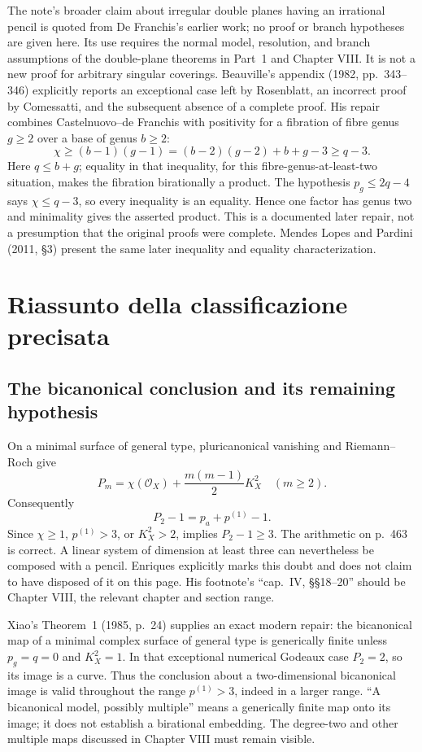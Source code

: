 The note's broader claim about irregular double planes having an irrational pencil is quoted from De Franchis's earlier work; no proof or branch hypotheses are given here. Its use requires the normal model, resolution, and branch assumptions of the double-plane theorems in Part~1 and Chapter VIII. It is not a new proof for arbitrary singular coverings. Beauville's appendix (1982, pp.~343--346) explicitly reports an exceptional case left by Rosenblatt, an incorrect proof by Comessatti, and the subsequent absence of a complete proof. His repair combines Castelnuovo--de Franchis with positivity for a fibration of fibre genus \(g\ge2\) over a base of genus \(b\ge2\):
\[
\chi\ge(b-1)(g-1)=(b-2)(g-2)+b+g-3\ge q-3.
\]
Here \(q\le b+g\); equality in that inequality, for this fibre-genus-at-least-two situation, makes the fibration birationally a product. The hypothesis \(p_g\le2q-4\) says \(\chi\le q-3\), so every inequality is an equality. Hence one factor has genus two and minimality gives the asserted product. This is a documented later repair, not a presumption that the original proofs were complete. Mendes Lopes and Pardini (2011, \S3) present the same later inequality and equality characterization.

\section{Riassunto della classificazione precisata}
\label{cp2-xi-9}

\subsection{The bicanonical conclusion and its remaining hypothesis}

On a minimal surface of general type, pluricanonical vanishing and Riemann--Roch give
\[
P_m=\chi(\mathcal O_X)+\frac{m(m-1)}2K_X^2\quad(m\ge2).
\]
Consequently
\[
P_2-1=p_a+p^{(1)}-1.
\]
Since \(\chi\ge1\), \(p^{(1)}>3\), or \(K_X^2>2\), implies \(P_2-1\ge3\). The arithmetic on p.~463 is correct. A linear system of dimension at least three can nevertheless be composed with a pencil. Enriques explicitly marks this doubt and does not claim to have disposed of it on this page. His footnote's ``cap.~IV, \S\S18--20'' should be Chapter VIII, the relevant chapter and section range.

Xiao's Theorem~1 (1985, p.~24) supplies an exact modern repair: the bicanonical map of a minimal complex surface of general type is generically finite unless \(p_g=q=0\) and \(K_X^2=1\). In that exceptional numerical Godeaux case \(P_2=2\), so its image is a curve. Thus the conclusion about a two-dimensional bicanonical image is valid throughout the range \(p^{(1)}>3\), indeed in a larger range. ``A bicanonical model, possibly multiple'' means a generically finite map onto its image; it does not establish a birational embedding. The degree-two and other multiple maps discussed in Chapter VIII must remain visible.


